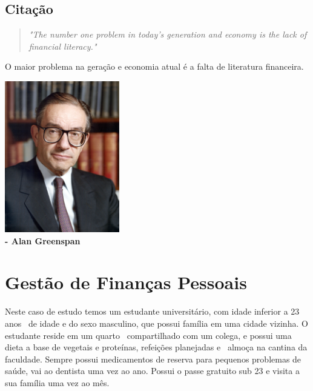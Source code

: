 \documentclass[a4paper,11pt]{report}
\begin{document}
		\vskip 0.5cm

		\begin{multicols}{2}
			\section{Citação \cite{intro:citacao}} %
			\vskip -1cm
			\begin{center}
				\begin{quote}
					\LARGE
					\emph{"The number one problem in today’s generation and economy is the lack of financial literacy."}
				\end{quote}
				\normalsize{O maior problema na geração e economia atual é a falta de literatura financeira.} \\
			\end{center}
			\vskip -1cm
			\begin{center}
				\includegraphics[width=5cm]{./alan_greenspan.jpg} \\
				\Large \textbf{- Alan Greenspan \cite{intro:bibliografia}}
			\end{center}
		\end{multicols}

		\chapter{Gestão de Finanças Pessoais}
			\begin{minipage}{\textwidth}
				\hspace{1cm} Neste caso de estudo temos um estudante universitário, com idade inferior a 23 anos \
				de idade e do sexo masculino, que possui família em uma cidade vizinha. O estudante reside em um quarto \
				compartilhado com um colega, e possui uma dieta a base de vegetais e proteínas, refeições planejadas e \
				almoça na cantina da faculdade.  Sempre possui medicamentos de reserva para pequenos problemas de saúde, 
				vai ao dentista uma vez ao ano. Possui o passe gratuito sub 23 e visita a sua família uma vez ao mês. 
			\end{minipage}
\end{document}
